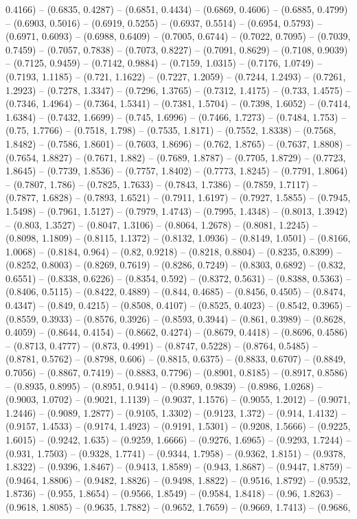 0.4166) -- (0.6835, 0.4287) -- (0.6851, 0.4434) -- (0.6869, 0.4606) -- (0.6885, 0.4799) -- (0.6903, 0.5016) -- (0.6919, 0.5255) -- (0.6937, 0.5514) -- (0.6954, 0.5793) -- (0.6971, 0.6093) -- (0.6988, 0.6409) -- (0.7005, 0.6744) -- (0.7022, 0.7095) -- (0.7039, 0.7459) -- (0.7057, 0.7838) -- (0.7073, 0.8227) -- (0.7091, 0.8629) -- (0.7108, 0.9039) -- (0.7125, 0.9459) -- (0.7142, 0.9884) -- (0.7159, 1.0315) -- (0.7176, 1.0749) -- (0.7193, 1.1185) -- (0.721, 1.1622) -- (0.7227, 1.2059) -- (0.7244, 1.2493) -- (0.7261, 1.2923) -- (0.7278, 1.3347) -- (0.7296, 1.3765) -- (0.7312, 1.4175) -- (0.733, 1.4575) -- (0.7346, 1.4964) -- (0.7364, 1.5341) -- (0.7381, 1.5704) -- (0.7398, 1.6052) -- (0.7414, 1.6384) -- (0.7432, 1.6699) -- (0.745, 1.6996) -- (0.7466, 1.7273) -- (0.7484, 1.753) -- (0.75, 1.7766) -- (0.7518, 1.798) -- (0.7535, 1.8171) -- (0.7552, 1.8338) -- (0.7568, 1.8482) -- (0.7586, 1.8601) -- (0.7603, 1.8696) -- (0.762, 1.8765) -- (0.7637, 1.8808) -- (0.7654, 1.8827) -- (0.7671, 1.882) -- (0.7689, 1.8787) -- (0.7705, 1.8729) -- (0.7723, 1.8645) -- (0.7739, 1.8536) -- (0.7757, 1.8402) -- (0.7773, 1.8245) -- (0.7791, 1.8064) -- (0.7807, 1.786) -- (0.7825, 1.7633) -- (0.7843, 1.7386) -- (0.7859, 1.7117) -- (0.7877, 1.6828) -- (0.7893, 1.6521) -- (0.7911, 1.6197) -- (0.7927, 1.5855) -- (0.7945, 1.5498) -- (0.7961, 1.5127) -- (0.7979, 1.4743) -- (0.7995, 1.4348) -- (0.8013, 1.3942) -- (0.803, 1.3527) -- (0.8047, 1.3106) -- (0.8064, 1.2678) -- (0.8081, 1.2245) -- (0.8098, 1.1809) -- (0.8115, 1.1372) -- (0.8132, 1.0936) -- (0.8149, 1.0501) -- (0.8166, 1.0068) -- (0.8184, 0.964) -- (0.82, 0.9218) -- (0.8218, 0.8804) -- (0.8235, 0.8399) -- (0.8252, 0.8003) -- (0.8269, 0.7619) -- (0.8286, 0.7249) -- (0.8303, 0.6892) -- (0.832, 0.6551) -- (0.8338, 0.6226) -- (0.8354, 0.592) -- (0.8372, 0.5631) -- (0.8388, 0.5363) -- (0.8406, 0.5115) -- (0.8422, 0.4889) -- (0.844, 0.4685) -- (0.8456, 0.4505) -- (0.8474, 0.4347) -- (0.849, 0.4215) -- (0.8508, 0.4107) -- (0.8525, 0.4023) -- (0.8542, 0.3965) -- (0.8559, 0.3933) -- (0.8576, 0.3926) -- (0.8593, 0.3944) -- (0.861, 0.3989) -- (0.8628, 0.4059) -- (0.8644, 0.4154) -- (0.8662, 0.4274) -- (0.8679, 0.4418) -- (0.8696, 0.4586) -- (0.8713, 0.4777) -- (0.873, 0.4991) -- (0.8747, 0.5228) -- (0.8764, 0.5485) -- (0.8781, 0.5762) -- (0.8798, 0.606) -- (0.8815, 0.6375) -- (0.8833, 0.6707) -- (0.8849, 0.7056) -- (0.8867, 0.7419) -- (0.8883, 0.7796) -- (0.8901, 0.8185) -- (0.8917, 0.8586) -- (0.8935, 0.8995) -- (0.8951, 0.9414) -- (0.8969, 0.9839) -- (0.8986, 1.0268) -- (0.9003, 1.0702) -- (0.9021, 1.1139) -- (0.9037, 1.1576) -- (0.9055, 1.2012) -- (0.9071, 1.2446) -- (0.9089, 1.2877) -- (0.9105, 1.3302) -- (0.9123, 1.372) -- (0.914, 1.4132) -- (0.9157, 1.4533) -- (0.9174, 1.4923) -- (0.9191, 1.5301) -- (0.9208, 1.5666) -- (0.9225, 1.6015) -- (0.9242, 1.635) -- (0.9259, 1.6666) -- (0.9276, 1.6965) -- (0.9293, 1.7244) -- (0.931, 1.7503) -- (0.9328, 1.7741) -- (0.9344, 1.7958) -- (0.9362, 1.8151) -- (0.9378, 1.8322) -- (0.9396, 1.8467) -- (0.9413, 1.8589) -- (0.943, 1.8687) -- (0.9447, 1.8759) -- (0.9464, 1.8806) -- (0.9482, 1.8826) -- (0.9498, 1.8822) -- (0.9516, 1.8792) -- (0.9532, 1.8736) -- (0.955, 1.8654) -- (0.9566, 1.8549) -- (0.9584, 1.8418) -- (0.96, 1.8263) -- (0.9618, 1.8085) -- (0.9635, 1.7882) -- (0.9652, 1.7659) -- (0.9669, 1.7413) -- (0.9686, 